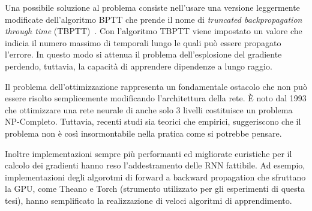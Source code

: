 Una possibile soluzione al problema consiste nell'usare una versione leggermente modificate dell'algoritmo BPTT che prende il nome di \emph{truncated backpropagation through time} (TBPTT)~\cite{Williams:1989}.
Con l'algoritmo TBPTT viene impostato un valore che indicia il numero massimo di temporali lungo le quali pu\`o essere propagato l'errore.
In questo modo si attenua il problema dell'esplosione del gradiente perdendo, tuttavia, la capacit\`a di apprendere dipendenze a lungo raggio.

Il problema dell'ottimizzazione rappresenta un fondamentale ostacolo che non pu\`o essere risolto semplicemente modificando l'architettura della rete.
\`E noto dal 1993 che ottimizzare una rete neurale di anche solo 3 livelli costituisce un problema NP-Completo.
Tuttavia, recenti studi sia teorici che empirici, suggeriscono che il problema non \`e cos\`i insormontabile nella pratica come si potrebbe pensare.

Inoltre implementazioni sempre pi\`u performanti ed migliorate euristiche per il calcolo dei gradienti hanno reso l'addestramento delle RNN fattibile.
Ad esempio, implementazioni degli algorotmi di forward a backward propagation che sfruttano la GPU, come Theano e Torch (strumento utilizzato per gli esperimenti di questa tesi), hanno semplificato la realizzazione di veloci algoritmi di apprendimento.
